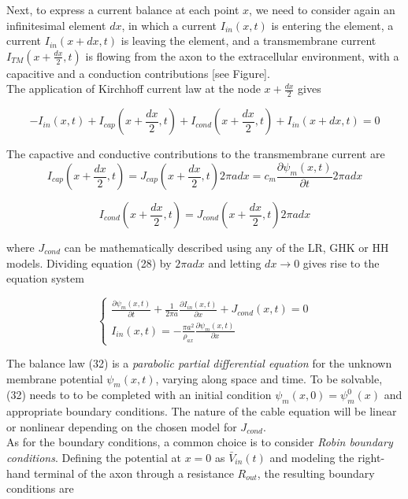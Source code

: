 \documentclass[a4paper]{article}
\begin{document}
Next, to express a current balance at each point $x$, we need to consider again an infinitesimal element $dx$, in which a current $I_{in}(x,t)$ is entering the element, a current $I_{in}(x+dx,t)$ is leaving the element, and a transmembrane current $I_{TM}(x+\frac{dx}{2},t)$ is flowing from the axon to the extracellular environment, with a capacitive and a conduction contributions [see Figure].\\
The application of Kirchhoff current law at the node  $x+\frac{dx}{2}$ gives

\begin{equation}
- I_{in}(x,t) + I_{cap}(x+\frac{dx}{2},t) + I_{cond}(x+\frac{dx}{2},t) + I_{in}(x+dx,t) = 0
\end{equation}

The capactive and conductive contributions to the transmembrane current are
\begin{equation}
  I_{cap}(x+\frac{dx}{2},t) = J_{cap}(x+\frac{dx}{2},t) 2 \pi a dx = c_m \frac{\partial \psi_m(x,t)}{\partial t} 2 \pi a dx 
\end{equation}

\begin{equation}
I_{cond}(x+\frac{dx}{2},t) = J_{cond}(x+\frac{dx}{2},t) 2 \pi a dx 
\end{equation}

where $J_{cond}$ can be mathematically described using any of the LR, GHK or HH models. Dividing equation (28)  by $2 \pi a dx $ and letting $dx \rightarrow 0$ gives rise to the equation system

\begin{equation}
\begin{cases}
\frac{\partial \psi_m(x,t)}{\partial t} + \frac{1}{2 \pi a }\frac{\partial I_{in}(x,t)}{\partial x} + J_{cond}(x,t) = 0 \\
I_{in}(x,t) = -\frac{\pi a^2}{\rho_{ax}}\frac{\partial \psi_m(x,t)}{\partial x}
\end{cases}
\end{equation}

The balance law (32) is a \textit{parabolic partial differential equation} for the unknown membrane potential $\psi_m(x,t) $, varying along space and time. To be solvable, (32) needs to to be completed with an initial condition $ \psi_m (x,0) = \psi_m^0(x)$ and appropriate boundary conditions. The nature of the cable equation will be linear or nonlinear depending on the chosen model for $J_{cond}$.\\
As for the boundary conditions, a common choice is to consider \textit{Robin boundary conditions}. Defining the potential at $x=0$ as $\bar{V}_{in}(t)$ and modeling the right-hand terminal of the axon through a resistance $R_{out}$, the resulting boundary conditions are
\end{document}
